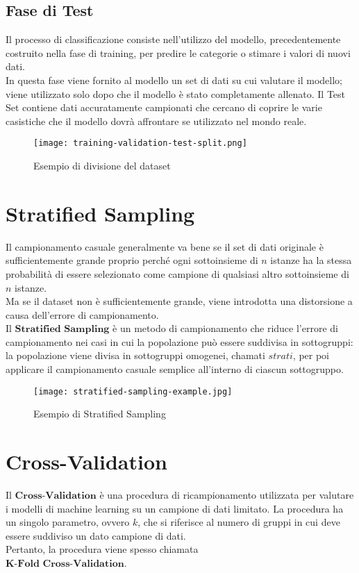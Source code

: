			\subsection{Fase di Test}
			Il processo di classificazione consiste nell'utilizzo del modello, precedentemente costruito nella fase di training, per predire le categorie o stimare i valori di nuovi dati.\\
			In questa fase viene fornito al modello un set di dati su cui valutare il modello; viene utilizzato solo dopo che il modello è stato completamente allenato.
			Il Test Set contiene dati accuratamente campionati che cercano di coprire le varie casistiche che il modello dovrà affrontare se utilizzato nel mondo reale.

		\begin{figure}[ht]
			\caption{Esempio di divisione del dataset}
			\centering
			\texttt{[image: training-validation-test-split.png]}
		\end{figure}

	\clearpage

	\section{Stratified Sampling}
		Il campionamento casuale generalmente va bene se il set di dati originale è sufficientemente grande proprio perché ogni sottoinsieme di $n$ istanze ha la stessa probabilità di essere selezionato come campione di qualsiasi altro sottoinsieme di $n$ istanze.
		\\
		Ma se il dataset non è sufficientemente grande, viene introdotta una distorsione a causa dell'errore di campionamento.
		\\[1\baselineskip]
		Il $\textbf{Stratified Sampling}$ è un metodo di campionamento che riduce l'errore di campionamento nei casi in cui la popolazione può essere suddivisa in sottogruppi:
		la popolazione viene divisa in sottogruppi omogenei, chamati $\textit{strati}$, per poi applicare il campionamento casuale semplice all'interno di ciascun sottogruppo.
		
		\begin{figure}[h]
			\caption{Esempio di Stratified Sampling}
			\centering
			\texttt{[image: stratified-sampling-example.jpg]}
		\end{figure}

	\clearpage

	\section{Cross-Validation}
		Il $\textbf{Cross-Validation}$ è una procedura di ricampionamento utilizzata per valutare i modelli di machine learning su un campione di dati limitato.
		La procedura ha un singolo parametro, ovvero $k$, che si riferisce al numero di gruppi in cui deve essere suddiviso un dato campione di dati.
		\\
		Pertanto, la procedura viene spesso chiamata
		\\
		$\textbf{K-Fold Cross-Validation}$.

